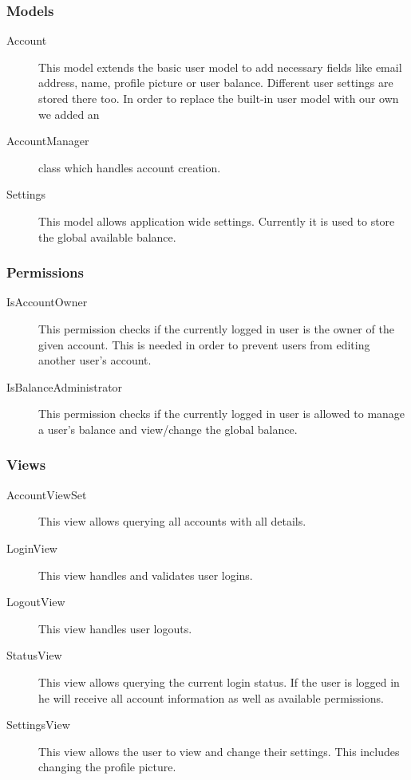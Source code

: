 \subsubsection{Models}\label{models-2}

\begin{description}
\item[Account] This model extends the basic user model to add
necessary fields like email address, name, profile picture or user
balance. Different user settings are stored there too. In order to
replace the built-in user model with our own we added an
\item[AccountManager] class which handles account creation.

\item[Settings] This model allows application wide settings. Currently
it is used to store the global available balance.
\end{description}

\subsubsection{Permissions}\label{permissions-1}

\begin{description}
\item[IsAccountOwner] This permission checks if the currently logged
in user is the owner of the given account. This is needed in order to
prevent users from editing another user's account.

\item[IsBalanceAdministrator] This permission checks if the currently
logged in user is allowed to manage a user's balance and view/change the
global balance.
\end{description}

\subsubsection{Views}\label{views-2}

\begin{description}
\item[AccountViewSet] This view allows querying all accounts with all
details.

\item[LoginView] This view handles and validates user logins.

\item[LogoutView] This view handles user logouts.

\item[StatusView] This view allows querying the current login status.
If the user is logged in he will receive all account information as well
as available permissions.

\item[SettingsView] This view allows the user to view and change their
settings. This includes changing the profile picture.
\end{description}

